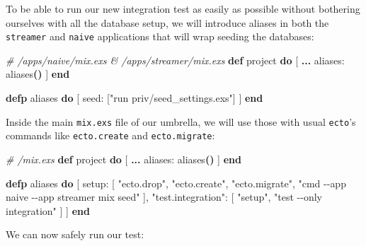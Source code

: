 \documentclass[
  oneside]{book}
\newenvironment{Shaded}{\begin{snugshade}}{\end{snugshade}}
\newcommand{\CommentTok}[1]{\textcolor[rgb]{0.56,0.35,0.01}{\textit{#1}}}
\newcommand{\ExtensionTok}[1]{#1}
\newcommand{\FunctionTok}[1]{\textcolor[rgb]{0.13,0.29,0.53}{\textbf{#1}}}
\newcommand{\KeywordTok}[1]{\textcolor[rgb]{0.13,0.29,0.53}{\textbf{#1}}}
\newcommand{\NormalTok}[1]{#1}
\newcommand{\OperatorTok}[1]{\textcolor[rgb]{0.81,0.36,0.00}{\textbf{#1}}}
\newcommand{\OtherTok}[1]{\textcolor[rgb]{0.56,0.35,0.01}{#1}}
\newcommand{\StringTok}[1]{\textcolor[rgb]{0.31,0.60,0.02}{#1}}
\newcommand{\VariableTok}[1]{\textcolor[rgb]{0.00,0.00,0.00}{#1}}
\begin{document}
To be able to run our new integration test as easily as possible without bothering ourselves with all the database setup, we will introduce aliases in both the \texttt{streamer} and \texttt{naive} applications that will wrap seeding the databases:

\begin{Shaded}
\begin{Highlighting}[]
\CommentTok{\# /apps/naive/mix.exs \& /apps/streamer/mix.exs }
  \KeywordTok{def}\NormalTok{ project }\KeywordTok{do}
    \OtherTok{[}
      \OperatorTok{...}
      \VariableTok{aliases:}\NormalTok{ aliases}\FunctionTok{()}
    \OtherTok{]}
  \KeywordTok{end}

  \KeywordTok{defp}\NormalTok{ aliases }\KeywordTok{do}
    \OtherTok{[}
      \VariableTok{seed:} \OtherTok{[}\StringTok{"run priv/seed\_settings.exs"}\OtherTok{]}
    \OtherTok{]}
  \KeywordTok{end}
\end{Highlighting}
\end{Shaded}

Inside the main \texttt{mix.exs} file of our umbrella, we will use those with usual \texttt{ecto}'s commands like \texttt{ecto.create} and \texttt{ecto.migrate}:

\begin{Shaded}
\begin{Highlighting}[]
  \CommentTok{\# /mix.exs }
  \KeywordTok{def}\NormalTok{ project }\KeywordTok{do}
    \OtherTok{[}
      \OperatorTok{...}
      \VariableTok{aliases:}\NormalTok{ aliases}\FunctionTok{()}
    \OtherTok{]}
  \KeywordTok{end}

  \KeywordTok{defp}\NormalTok{ aliases }\KeywordTok{do}
    \OtherTok{[}
      \VariableTok{setup:} \OtherTok{[}
        \StringTok{"ecto.drop"}\NormalTok{,}
        \StringTok{"ecto.create"}\NormalTok{,}
        \StringTok{"ecto.migrate"}\NormalTok{,}
        \StringTok{"cmd {-}{-}app naive {-}{-}app streamer mix seed"}
      \OtherTok{]}\NormalTok{,}
      \StringTok{"test.integration"}\NormalTok{: }\OtherTok{[}
        \StringTok{"setup"}\NormalTok{,}
        \StringTok{"test {-}{-}only integration"}
      \OtherTok{]}
    \OtherTok{]}
  \KeywordTok{end}
\end{Highlighting}
\end{Shaded}

We can now safely run our test:

\begin{Shaded}
\end{Shaded}
\end{document}
